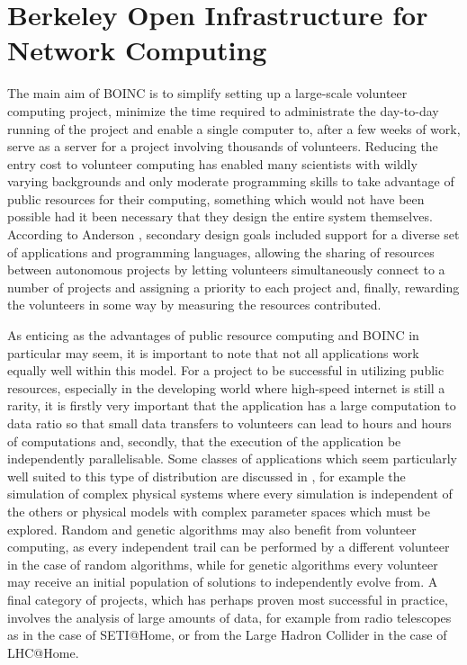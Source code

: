 \section{Berkeley Open Infrastructure for Network Computing}
The main aim of BOINC is to simplify setting up a large-scale volunteer computing project, minimize the time required to administrate the day-to-day running of the project and enable a single computer to, after a few weeks of work, serve as a server for a project involving thousands of volunteers. Reducing the entry cost to volunteer computing has enabled many scientists with wildly varying backgrounds and only moderate programming skills to take advantage of public resources for their computing, something which would not have been possible had it been necessary that they design the entire system themselves. According to Anderson \cite{anderson2004boinc},  secondary design goals included support for a diverse set of applications and programming languages, allowing the sharing of resources between autonomous projects by letting volunteers simultaneously connect to a number of projects and assigning a priority to each project   and, finally, rewarding the volunteers in some way by measuring the resources contributed.


As enticing as  the advantages of public resource computing and BOINC in particular may seem, it is important to note that not all applications   work equally well within this model. For a project to be successful in  utilizing public resources, especially in the developing world where high-speed internet is still a rarity,  it is firstly  very important that the application  has a large computation to data ratio so that small data transfers to volunteers can lead to hours and hours of computations and, secondly, that the execution of the application be independently parallelisable. Some classes of applications which seem particularly well suited to this type of distribution are discussed in \cite{anderson:pc}, for example the simulation of complex physical systems  where every simulation is independent of the others  or physical models with complex parameter spaces which must be explored. Random and genetic algorithms may also benefit from volunteer computing, as every independent trail can be performed by a different volunteer in the case of random algorithms, while for genetic algorithms every volunteer may receive an initial population of solutions to independently evolve from. A final category of projects, which has perhaps proven most successful in practice, involves the analysis of large amounts of data, for example from radio telescopes as in the case of SETI@Home, or  from the Large Hadron Collider in the case of LHC@Home.

